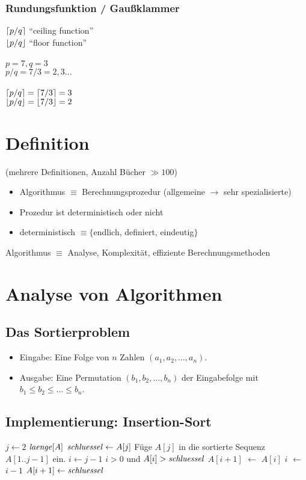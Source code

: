 \documentclass[a4paper,twoside,DIV15,BCOR12mm]{scrbook}
\begin{document}
\subsubsection*{Rundungsfunktion / Gaußklammer}

$\left\lceil p / q \right\rceil$ "`ceiling function"' \\
$\left\lfloor p / q \right\rfloor$ "`floor function"' \\ 
\\
$p = 7, q = 3$ \\
$p/q = 7/3 = 2,3...$ \\
\\
$\left\lceil p / q \right\rceil = \left\lceil 7 / 3 \right\rceil = 3$ \\
$\left\lfloor p / q \right\rfloor = \left\lfloor 7 / 3 \right\rfloor = 2$


\section{Definition}
(mehrere Definitionen, Anzahl Bücher $\gg 100$)
\begin{itemize}
\item Algorithmus $\equiv$ Berechnungsprozedur
(allgemeine $\rightarrow$ sehr spezialisierte)
\item Prozedur ist deterministisch oder nicht
\item deterministisch $\equiv \{$endlich, definiert, eindeutig$\}$ 
\end{itemize}
Algorithmus $\equiv$ Analyse, Komplexität, effiziente Berechnungsmethoden

\section{Analyse von Algorithmen}

\subsection{Das Sortierproblem}
\begin{itemize}
\item Eingabe: Eine Folge von $n$ Zahlen $(a_1, a_2, \dots, a_n)$.
\item Ausgabe: Eine Permutation $(b_1, b_2, \dots, b_n)$ der Eingabefolge mit
$b_1 \leqslant b_2 \leqslant \dots \leqslant b_n$.
\end{itemize}

\subsection{Implementierung: Insertion-Sort}
\begin{codebox}
\li    \For $j \gets 2$ \To $\id{laenge} [A]$
\li        \Do 
               $\id{schluessel} \gets A[j]$
\li            \Comment Füge $A[j]$ in die sortierte Sequenz $A[1..j-1]$ ein.
\li            $i \gets j-1$
\li            \While $i>0$ und $A[i] > \id{schluessel}$
\li                \Do
                   $A[i+1]$ $\gets$ $A[i]$
\li						     $i$ $\gets$ $i-1$
					         \End
\li			       $A[i+1] \gets \id{schluessel}$
			     \End
\end{codebox}
\end{document}
